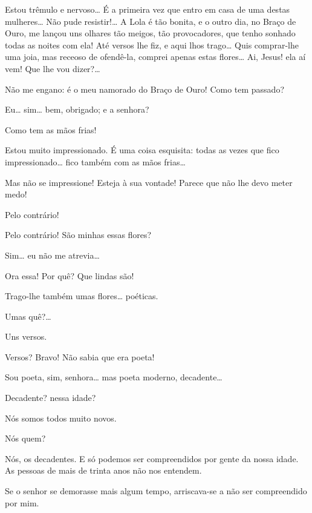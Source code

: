  Estou trêmulo e nervoso\ldots{} É a primeira vez que entro em casa de
uma destas mulheres\ldots{} Não pude resistir!\ldots{} A Lola é tão bonita, e o outro
dia, no Braço de Ouro, me lançou uns olhares tão meigos, tão provocadores, que tenho sonhado
todas as noites com ela! Até versos lhe fiz, e aqui lhos trago\ldots{} Quis
comprar-lhe uma joia, mas receoso de ofendê-la, comprei apenas estas flores\ldots{} Ai, Jesus!
ela aí vem! Que lhe vou dizer?\ldots{}


 Não me engano: é o meu namorado do Braço de Ouro!  Como tem passado?

 Eu\ldots{} sim\ldots{} bem, obrigado; e a senhora?

 Como tem as mãos frias!

 Estou muito impressionado. É uma coisa esquisita: todas as vezes
que fico impressionado\ldots{} fico também com as mãos frias\ldots{}

 Mas não se impressione! Esteja à sua vontade! Parece que não lhe
devo meter medo!

 Pelo contrário!

  Pelo contrário!  São minhas essas
flores?

 Sim\ldots{} eu não me atrevia\ldots{} 

 Ora essa! Por quê?  Que lindas são!

 Trago-lhe também umas flores\ldots{} poéticas.

 Umas quê?\ldots{}

 Uns versos.

 Versos? Bravo! Não sabia que era poeta!

 Sou poeta, sim, senhora\ldots{} mas poeta moderno, decadente\ldots{}

 Decadente? nessa idade?

 Nós somos todos muito novos.

 Nós quem?

 Nós, os decadentes. E só podemos ser compreendidos por gente da
nossa idade. As pessoas de mais de trinta anos não nos entendem.

 Se o senhor se demorasse mais algum tempo, arriscava-se a não ser
compreendido por mim.


